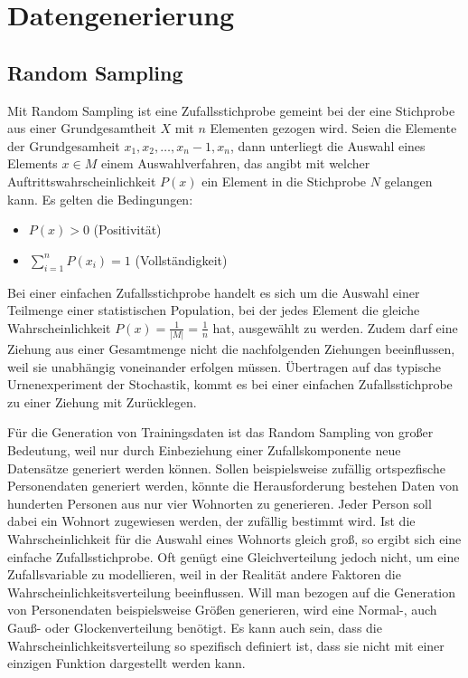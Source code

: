 
\chapter{Datengenerierung}

\section{Random Sampling}

Mit Random Sampling ist eine Zufallsstichprobe gemeint bei der eine Stichprobe aus einer Grundgesamtheit $X$ mit $n$ Elementen gezogen wird. Seien die Elemente der Grundgesamheit $x_1,x_2,\dots,x_n-1,x_n$, dann unterliegt die Auswahl eines Elements $x \in M$ einem Auswahlverfahren, das angibt mit welcher Auftrittswahrscheinlichkeit $P(x)$ ein Element in die Stichprobe $N$ gelangen kann.
Es gelten die Bedingungen:
\begin{itemize}
    \item $P(x) > 0$ (Positivität)
    \item $\sum_{i=1}^{n}P(x_i)=1$ (Vollständigkeit)
\end{itemize}

Bei einer einfachen Zufallsstichprobe handelt es sich um die Auswahl einer Teilmenge einer statistischen Population, bei der jedes Element die gleiche Wahrscheinlichkeit $P(x)=\frac{1}{\lvert M \rvert}=\frac{1}{n}$ hat, ausgewählt zu werden. Zudem darf eine Ziehung aus einer Gesamtmenge nicht die nachfolgenden Ziehungen beeinflussen, weil sie unabhängig voneinander erfolgen müssen. Übertragen auf das typische Urnenexperiment der Stochastik, kommt es bei einer einfachen Zufallsstichprobe zu einer Ziehung mit Zurücklegen.

Für die Generation von Trainingsdaten ist das Random Sampling von großer Bedeutung, weil nur durch Einbeziehung einer Zufallskomponente neue Datensätze generiert werden können. Sollen beispielsweise zufällig ortspezfische Personendaten generiert werden, könnte die Herausforderung bestehen Daten von hunderten Personen aus nur vier Wohnorten zu generieren. Jeder Person soll dabei ein Wohnort zugewiesen werden, der zufällig bestimmt wird. Ist die Wahrscheinlichkeit für die Auswahl eines Wohnorts gleich groß, so ergibt sich eine einfache Zufallsstichprobe. Oft genügt eine Gleichverteilung jedoch nicht, um eine Zufallsvariable zu modellieren, weil in der Realität andere Faktoren die Wahrscheinlichkeitsverteilung beeinflussen. Will man bezogen auf die Generation von Personendaten beispielsweise Größen generieren, wird eine Normal-, auch Gauß- oder Glockenverteilung benötigt. Es kann auch sein, dass die Wahrscheinlichkeitsverteilung so spezifisch definiert ist, dass sie nicht mit einer einzigen Funktion dargestellt werden kann.

